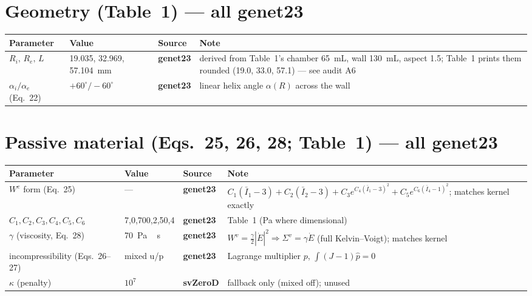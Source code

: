 \documentclass[10pt]{article}
\newcommand{\gen}{\textcolor{cgen}{\textbf{genet23}}}
\newcommand{\svz}{\textcolor{csvz}{\textbf{svZeroD}}}
\begin{document}
\section*{Geometry (Table~1) --- all \gen}
\begin{longtable}{l l l P{6.6cm}}
\toprule Parameter & Value & Source & Note \\ \midrule\endhead
$R_i,\,R_e,\,L$ & 19.035, 32.969, \SI{57.104}{mm} & \gen & derived from Table~1's chamber \SI{65}{mL}, wall \SI{130}{mL}, aspect 1.5; Table~1 prints them rounded (19.0, 33.0, 57.1) --- see audit A6 \\
$\alpha_i/\alpha_e$ (Eq.~22) & $+60^\circ/-60^\circ$ & \gen & linear helix angle $\alpha(R)$ across the wall \\
\bottomrule
\end{longtable}

\section*{Passive material (Eqs.~25, 26, 28; Table~1) --- all \gen}
\begin{longtable}{l l l P{6.6cm}}
\toprule Parameter & Value & Source & Note \\ \midrule\endhead
$W^e$ form (Eq.~25) & --- & \gen & $C_1(\bar I_1{-}3){+}C_2(\bar I_2{-}3){+}C_3e^{C_4(\bar I_1-3)^2}{+}C_5e^{C_6(\bar I_4-1)^2}$; matches kernel exactly \\
$C_1{,}C_2{,}C_3{,}C_4{,}C_5{,}C_6$ & 7,0,700,2,50,4 & \gen & Table~1 (Pa where dimensional) \\
$\gamma$ (viscosity, Eq.~28) & \SI{70}{Pa\,s} & \gen & $W^v=\tfrac{\gamma}{2}|\dot E|^2\Rightarrow\Sigma^v=\gamma\dot E$ (full Kelvin--Voigt); matches kernel \\
incompressibility (Eqs.~26--27) & mixed u/p & \gen & Lagrange multiplier $p$, $\int(J{-}1)\hat p=0$ \\
$\kappa$ (penalty) & $10^7$ & \svz & fallback only (mixed off); unused \\
\bottomrule
\end{longtable}

\end{document}
